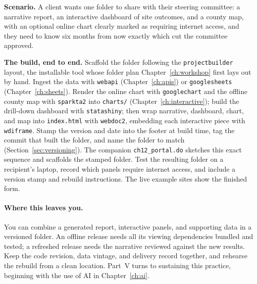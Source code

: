 \begin{appliedexample}\label{ae:ch12-onefolder}
\textbf{Scenario.} A client wants one folder to share with their steering committee: a narrative report, an interactive dashboard of site outcomes, and a county map, with an optional online chart clearly marked as requiring internet access, and they need to know six months from now exactly which cut the committee approved.

\medskip
\textbf{The build, end to end.} Scaffold the folder following the \texttt{projectbuilder} layout, the installable tool whose folder plan Chapter~\ref{ch:workshop} first lays out by hand. Ingest the data with \texttt{webapi} (Chapter~\ref{ch:apis}) or \texttt{googlesheets} (Chapter~\ref{ch:sheets}). Render the online chart with \texttt{googlechart} and the offline county map with \texttt{sparkta2} into \texttt{charts/} (Chapter~\ref{ch:interactive}); build the drill-down dashboard with \texttt{statashiny}; then wrap narrative, dashboard, chart, and map into \texttt{index.html} with \texttt{webdoc2}, embedding each interactive piece with \texttt{wdiframe}. Stamp the version and date into the footer at build time, tag the commit that built the folder, and name the folder to match (Section~\ref{sec:versioning}). The companion \texttt{ch12\_portal.do} sketches this exact sequence and scaffolds the stamped folder. Test the resulting folder on a recipient's laptop, record which panels require internet access, and include a version stamp and rebuild instructions. The live example sites show the finished form.
\end{appliedexample}

\paragraph{Where this leaves you.} You can combine a generated report, interactive panels, and supporting data in a versioned folder. An offline release needs all its viewing dependencies bundled and tested; a refreshed release needs the narrative reviewed against the new results. Keep the code revision, data vintage, and delivery record together, and rehearse the rebuild from a clean location. Part~V turns to sustaining this practice, beginning with the use of AI in Chapter~\ref{ch:ai}.

